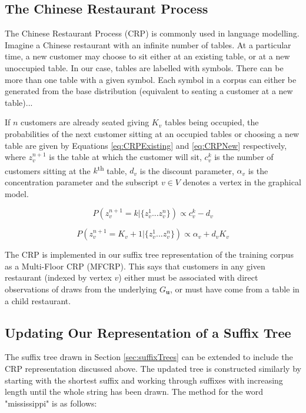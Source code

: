 \subsection{The Chinese Restaurant Process}

The Chinese Restaurant Process (CRP) is commonly used in language modelling. Imagine a Chinese restaurant with an infinite number of tables. At a particular time, a new customer may choose to sit either at an existing table, or at a new unoccupied table. In our case, tables are labelled with symbols. There can be more than one table with a given symbol. Each symbol in a corpus can either be generated from the base distribution (equivalent to seating a customer at a new table)... 

If $n$ customers are already seated giving $K_{v}$ tables being occupied, the probabilities of the next customer sitting at an occupied tables or choosing a new table are given by Equations \ref{eq:CRPExisting} and \ref{eq:CRPNew} respectively, where $z_{v}^{n+1}$ is the table at which the customer will sit, $c_{v}^{k}$ is the number of customers sitting at the $k$\textsuperscript{th} table, $d_{v}$ is the discount parameter, $\alpha_{v}$ is the concentration parameter and the subscript $v\in V$ denotes a vertex in the graphical model.

\begin{equation}
P(z_{v}^{n+1}=k|\{z_{v}^{1}...z_{v}^{n}\})\propto c_{v}^{k}-d_{v}
\label{eq:CRPExisting}
\end{equation}

\begin{equation}
P(z_{v}^{n+1}=K_{v}+1|\{z_{v}^{1}...z_{v}^{n}\})\propto \alpha_{v}+d_{v}K_{v}
\label{eq:CRPNew}
\end{equation}

The CRP is implemented in our suffix tree representation of the training corpus as a Multi-Floor CRP (MFCRP). This says that customers in any given restaurant (indexed by vertex $v$) either must be associated with direct observations of draws from the underlying $G_{\boldsymbol{u}}$, or must have come from a table in a child restaurant. 

\subsection{Updating Our Representation of a Suffix Tree}

The suffix tree drawn in Section \ref{sec:suffixTrees} can be extended to include the CRP representation discussed above. The updated tree is constructed similarly by starting with the shortest suffix and working through suffixes with increasing length until the whole string has been drawn. The method for the word "mississippi" is as follows:

